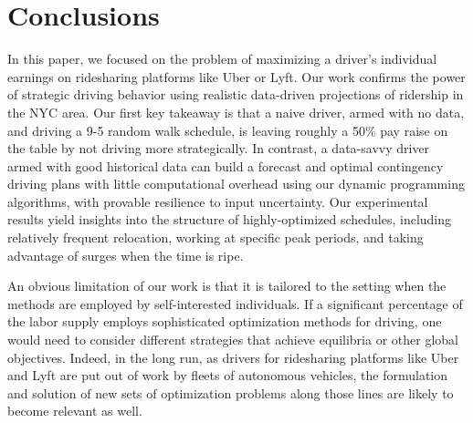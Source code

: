 
\section{Conclusions}
\label{sec:conclusions}
In this paper, we focused on the problem of 
maximizing a driver's individual earnings on ridesharing platforms like Uber or Lyft.
Our work confirms the power of strategic driving behavior %
using realistic data-driven projections
of ridership in the NYC area.  Our first key takeaway is that a naive driver,
armed with no data, and driving a 9-5 random walk schedule, is leaving 
roughly a 50\% pay raise on the table by not driving more strategically. 
In contrast, a data-savvy driver armed with
good historical data can build a forecast and optimal contingency driving plans 
with little computational overhead using 
our dynamic programming algorithms, with provable resilience to input
uncertainty.  Our experimental results yield insights into the
structure of highly-optimized schedules, including relatively frequent relocation,
working at specific peak periods, and taking advantage of 
surges when the time is ripe.  

An obvious limitation of our work is that it is tailored to the setting when the 
methods are employed by self-interested individuals.  If a 
significant percentage of the labor supply employs sophisticated optimization methods
for driving, one would need to consider different strategies that achieve equilibria
or other global objectives. %
Indeed, in the long run, as drivers for ridesharing 
platforms like Uber and Lyft are put out of work by fleets of autonomous vehicles, 
the formulation and solution of new sets of optimization problems along those lines
are likely to become relevant as well.



